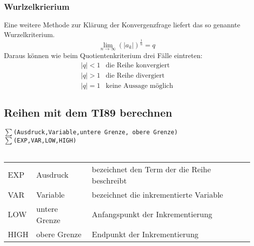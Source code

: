 \subsubsection*{Wurlzelkrierium}
Eine weitere Methode zur Klärung der Konvergenzfrage liefert das so genannte Wurzelkriterium.
\[ \lim\limits_{n \rightarrow \infty} \left( |a_k| \right)^{\frac{1}{n}} = q\]
Daraus können wie beim Quotientenkriterium drei Fälle eintreten:
\[ \boxed{\begin{array}{ll}
|q| < 1 & \text{die Reihe konvergiert} \\
|q| > 1 & \text{die Reihe divergiert} \\
|q| = 1 & \text{keine Aussage möglich} 
\end{array}} \]


\ifti
\subsection{Reihen mit dem TI89 berechnen}
$\sum$\verb{(Ausdruck,Variable,untere Grenze, obere Grenze){ \\
$\sum$\verb{(EXP,VAR,LOW,HIGH){ \\\\
\begin{tabular}{lll}
EXP  & Ausdruck      & bezeichnet den Term der die Reihe beschreibt \\
VAR  & Variable      & bezeichnet die inkrementierte Variable \\
LOW  & untere Grenze & Anfangspunkt der Inkrementierung \\
HIGH & obere Grenze  & Endpunkt der Inkrementierung \\
\end{tabular}
\fi
